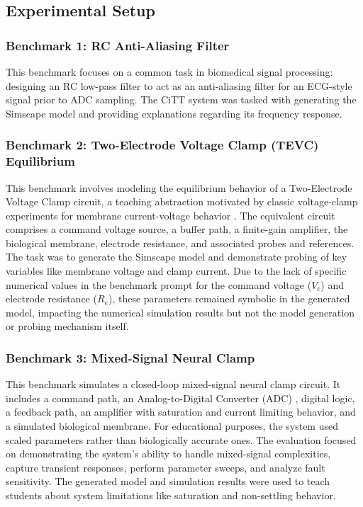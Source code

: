 \documentclass[10pt,twocolumn,letterpaper]{article}
\begin{document}
\subsection{Experimental Setup}
\label{sec:exp_setup}
\subsubsection{Benchmark 1: RC Anti-Aliasing Filter}
This benchmark focuses on a common task in biomedical signal processing: designing an RC low-pass filter to act as an anti-aliasing filter for an ECG-style signal prior to ADC sampling. The CiTT system was tasked with generating the Simscape model and providing explanations regarding its frequency response.

\subsubsection{Benchmark 2: Two-Electrode Voltage Clamp (TEVC) Equilibrium}
This benchmark involves modeling the equilibrium behavior of a Two-Electrode Voltage Clamp circuit, a teaching abstraction motivated by classic voltage-clamp experiments for membrane current-voltage behavior \cite{hodgkin_huxley_katz_1952}. The equivalent circuit comprises a command voltage source, a buffer path, a finite-gain amplifier, the biological membrane, electrode resistance, and associated probes and references. The task was to generate the Simscape model and demonstrate probing of key variables like membrane voltage and clamp current. Due to the lack of specific numerical values in the benchmark prompt for the command voltage ($V_c$) and electrode resistance ($R_e$), these parameters remained symbolic in the generated model, impacting the numerical simulation results but not the model generation or probing mechanism itself.

\subsubsection{Benchmark 3: Mixed-Signal Neural Clamp}
This benchmark simulates a closed-loop mixed-signal neural clamp circuit. It includes a command path, an Analog-to-Digital Converter (ADC) \cite{webster_medical_instrumentation_2020}, digital logic, a feedback path, an amplifier with saturation and current limiting behavior, and a simulated biological membrane. For educational purposes, the system used scaled parameters rather than biologically accurate ones. The evaluation focused on demonstrating the system's ability to handle mixed-signal complexities, capture transient responses, perform parameter sweeps, and analyze fault sensitivity. The generated model and simulation results were used to teach students about system limitations like saturation and non-settling behavior.
\end{document}
